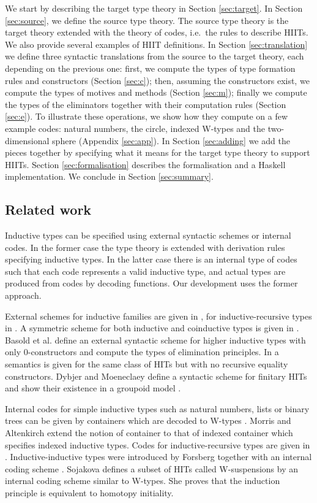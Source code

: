 \documentclass[a4paper,UKenglish]{lipics-v2018}
\newcommand{\1}{\mathsf{1}} \renewcommand{\Pr}{\mathsf{Pr}}
\begin{document}
We start by describing the target type theory in Section
\ref{sec:target}. In Section \ref{sec:source}, we define the source
type theory. The source type theory is the target theory extended with
the theory of codes, i.e.\ the rules to describe HIITs. We also
provide several examples of HIIT definitions. In Section
\ref{sec:translation} we define three syntactic translations from the
source to the target theory, each depending on the previous one:
first, we compute the types of type formation rules and constructors
(Section \ref{sec:c}); then, assuming the constructors exist, we
compute the types of motives and methods (Section \ref{sec:m});
finally we compute the types of the eliminators together with their
computation rules (Section \ref{sec:e}). To illustrate these
operations, we show how they compute on a few example codes: natural
numbers, the circle, indexed W-types and the two-dimensional sphere
(Appendix \ref{sec:app}). In Section \ref{sec:adding} we add the
pieces together by specifying what it means for the target type theory
to support HIITs. Section \ref{sec:formalisation} describes the
formalisation and a Haskell implementation. We conclude in Section
\ref{sec:summary}.

\subsection{Related work}

Inductive types can be specified using external syntactic schemes or
internal codes. In the former case the type theory is extended with
derivation rules specifying inductive types. In the latter case there
is an internal type of codes such that each code represents a valid
inductive type, and actual types are produced from codes by decoding
functions. Our development uses the former approach.

External schemes for inductive families are given in
\cite{Dybjer97inductivefamilies,paulinmohring}, for
inductive-recursive types in \cite{dybjer00ir}. A symmetric scheme for
both inductive and coinductive types is given in
\cite{henning}. Basold et al. \cite{niels} define an external
syntactic scheme for higher inductive types with only 0-constructors
and compute the types of elimination principles. In \cite{nielsmsc} a
semantics is given for the same class of HITs but with no recursive
equality constructors. Dybjer and Moeneclaey define a syntactic scheme
for finitary HITs and show their existence in a groupoid model
\cite{moeneclaey}.

Internal codes for simple inductive types such as natural numbers,
lists or binary trees can be given by containers which are decoded to
W-types \cite{abbot05containers}. Morris and Altenkirch
\cite{morris09indexed} extend the notion of container to that of
indexed container which specifies indexed inductive types. Codes for
inductive-recursive types are given in
\cite{Dybjer99afinite}. Inductive-inductive types were introduced by
Forsberg together with an internal coding scheme
\cite{forsberg-phd}. Sojakova \cite{sojakova} defines a subset of HITs
called W-suspensions by an internal coding scheme similar to
W-types. She proves that the induction principle is equivalent to
homotopy initiality.
\end{document}
